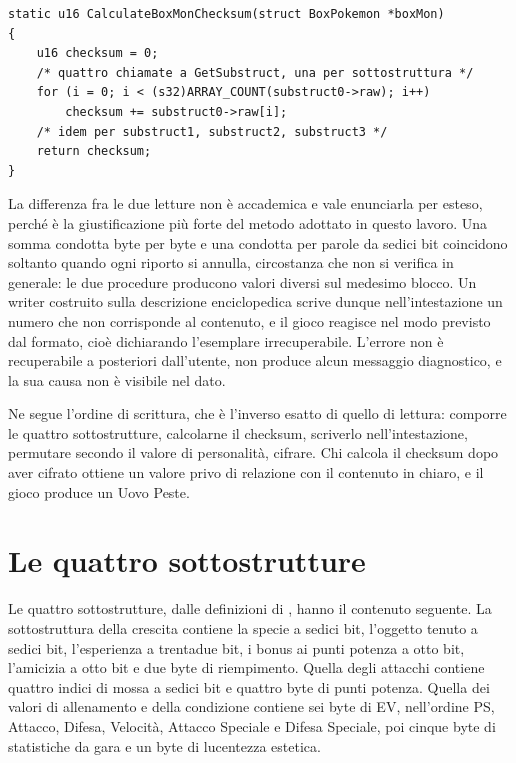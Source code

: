 \begin{verbatim}
static u16 CalculateBoxMonChecksum(struct BoxPokemon *boxMon)
{
    u16 checksum = 0;
    /* quattro chiamate a GetSubstruct, una per sottostruttura */
    for (i = 0; i < (s32)ARRAY_COUNT(substruct0->raw); i++)
        checksum += substruct0->raw[i];
    /* idem per substruct1, substruct2, substruct3 */
    return checksum;
}
\end{verbatim}

La differenza fra le due letture non è accademica e vale enunciarla per esteso, perché è la giustificazione più forte del metodo adottato in questo lavoro. Una somma condotta byte per byte e una condotta per parole da sedici bit coincidono soltanto quando ogni riporto si annulla, circostanza che non si verifica in generale: le due procedure producono valori diversi sul medesimo blocco. Un writer costruito sulla descrizione enciclopedica scrive dunque nell'intestazione un numero che non corrisponde al contenuto, e il gioco reagisce nel modo previsto dal formato, cioè dichiarando l'esemplare irrecuperabile. L'errore non è recuperabile a posteriori dall'utente, non produce alcun messaggio diagnostico, e la sua causa non è visibile nel dato.

Ne segue l'ordine di scrittura, che è l'inverso esatto di quello di lettura: comporre le quattro sottostrutture, calcolarne il checksum, scriverlo nell'intestazione, permutare secondo il valore di personalità, cifrare. Chi calcola il checksum dopo aver cifrato ottiene un valore privo di relazione con il contenuto in chiaro, e il gioco produce un Uovo Peste.

\section{Le quattro sottostrutture}

Le quattro sottostrutture, dalle definizioni di  \cite{pokeemerald}, hanno il contenuto seguente. La sottostruttura della crescita contiene la specie a sedici bit, l'oggetto tenuto a sedici bit, l'esperienza a trentadue bit, i bonus ai punti potenza a otto bit, l'amicizia a otto bit e due byte di riempimento. Quella degli attacchi contiene quattro indici di mossa a sedici bit e quattro byte di punti potenza. Quella dei valori di allenamento e della condizione contiene sei byte di EV, nell'ordine PS, Attacco, Difesa, Velocità, Attacco Speciale e Difesa Speciale, poi cinque byte di statistiche da gara e un byte di lucentezza estetica.

